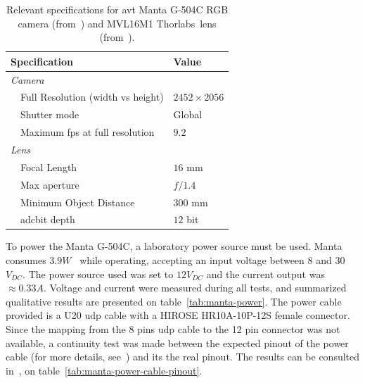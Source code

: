 \begin{table}[H]
	\renewcommand{\arraystretch}{1.2}
	\centering
	\begin{tabular}{@{}lp{7cm}l@{}}
		\toprule
		\multicolumn{2}{l}{Specification} & Value \\ \midrule
		\multicolumn{2}{l}{\emph{Camera}} & \\
		\phantom{a} & Full Resolution (width vs height) & $2452 \times 2056$   \\
									& Shutter mode & Global \\
									&	Maximum \ac{fps} at full resolution & $9.2$ \\ \midrule 
									\multicolumn{2}{l}{\emph{Lens}} \\
									&	Focal Length & $16$ mm \\
									&	Max aperture & $f/1.4$ \\
									&	Minimum Object Distance & $300$ mm  \\
									& \acs{adc}\footnotemark bit depth & $12$ bit \\
		\bottomrule
	\end{tabular}
	\caption{Relevant specifications for \ac{avt} Manta G-504C RGB camera (from~\cite{MantaG504C})  and MVL16M1 Thorlabs\cp~lens (from~\cite{Thorlabs}).}
	\label{tab:camera-and-lens-specs}
\end{table}


To power the Manta G-504C, a laboratory power source must be used. Manta consumes $3.9 W$~\cite{MantaG504C} while operating, accepting an input voltage between $8$ and $30$ $V_{DC}$. The power source used was set to  $12 V_{DC}$ and the current output was $\approx 0.33A$. Voltage and current were measured during all tests, and summarized qualitative results are presented on table~\ref{tab:manta-power}. The power cable provided is a U20 \ac{udp} cable with a HIROSE HR10A-10P-12S female connector. Since the mapping from the 8 pins \ac{udp} cable to the 12 pin connector was not available, a continuity test was made between the expected pinout of the power cable (for more details, see~\cite{AVTCables}) and its the real pinout. The results can be consulted in~, on table~\ref{tab:manta-power-cable-pinout}.

